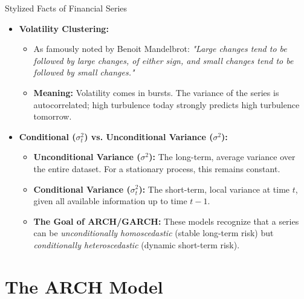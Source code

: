 \documentclass[aspectratio=169]{beamer}
\begin{document}
\begin{frame}{Stylized Facts of Financial Series}
\begin{itemize}
    \item \textbf{Volatility Clustering:} 
    \begin{itemize}
        \item As famously noted by Benoit Mandelbrot: \textit{"Large changes tend to be followed by large changes, of either sign, and small changes tend to be followed by small changes."}
        \item \textbf{Meaning:} Volatility comes in bursts. The variance of the series is autocorrelated; high turbulence today strongly predicts high turbulence tomorrow.
    \end{itemize}
    
    \vspace{0.4cm}
    
    \item \textbf{Conditional ($\sigma_t^2$) vs. Unconditional Variance ($\sigma^2$):} 
    \begin{itemize}
        \item \textbf{Unconditional Variance ($\sigma^2$):} The long-term, average variance over the entire dataset. For a stationary process, this remains constant.
        \item \textbf{Conditional Variance ($\sigma_t^2$):} The short-term, local variance at time $t$, given all available information up to time $t-1$. 
        \item \textbf{The Goal of ARCH/GARCH:} These models recognize that a series can be \textit{unconditionally homoscedastic} (stable long-term risk) but \textit{conditionally heteroscedastic} (dynamic short-term risk).
    \end{itemize}
\end{itemize}
\end{frame}

\section{The ARCH Model}
\end{document}
